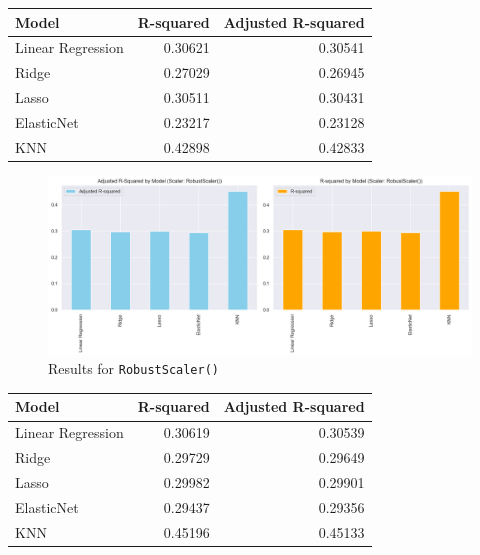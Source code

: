 \documentclass{article}
\theoremstyle{mytheoremstyle}
\theoremstyle{mytheoremstyle}
\theoremstyle{myproblemstyle}
\begin{document}
\begin{table}[ht]
\centering
\begin{tabular}{@{}lrr@{}}
\toprule
Model & \multicolumn{1}{c}{R-squared} & \multicolumn{1}{c}{Adjusted R-squared} \\ 
\midrule
Linear Regression & 0.30621 & 0.30541 \\
Ridge & 0.27029 & 0.26945 \\
Lasso & 0.30511 & 0.30431 \\
ElasticNet & 0.23217 & 0.23128 \\
KNN & 0.42898 & 0.42833 \\
\bottomrule
\end{tabular}
\label{tab:model_performance_updated_standard_scaler}
\end{table}

\FloatBarrier %
\pagebreak

\begin{figure}[htbp]
\centering
\includegraphics[width=\linewidth]{Images/evalRegModelRobustScaler.png}
\caption{Results for \texttt{RobustScaler()}}
\label{fig:Robust Scaler Results}
\end{figure}


\begin{table}[ht]
\centering
\begin{tabular}{@{}lrr@{}}
\toprule
Model             & \multicolumn{1}{c}{R-squared} & \multicolumn{1}{c}{Adjusted R-squared} \\ 
\midrule
Linear Regression  & 0.30619 & 0.30539 \\
Ridge              & 0.29729 & 0.29649 \\
Lasso              & 0.29982 & 0.29901 \\
ElasticNet         & 0.29437 & 0.29356 \\
KNN                & 0.45196 & 0.45133 \\
\bottomrule
\end{tabular}
\label{tab:model_performance_updated}
\end{table}
\end{document}

